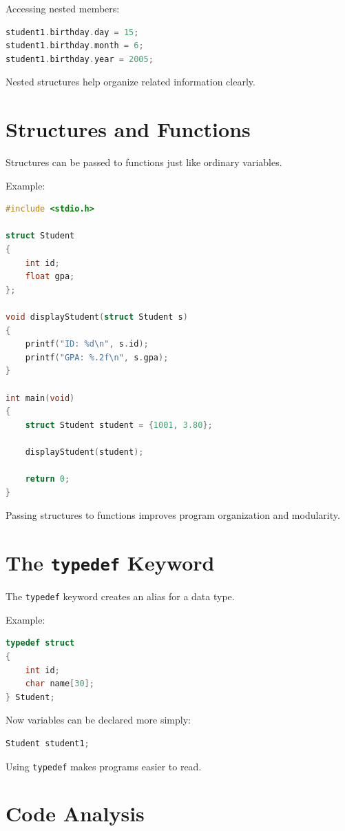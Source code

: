 \documentclass[12pt,openany]{book}
\begin{document}
Accessing nested members:

\begin{lstlisting}[language=C]
student1.birthday.day = 15;
student1.birthday.month = 6;
student1.birthday.year = 2005;
\end{lstlisting}

Nested structures help organize related information clearly.

\section{Structures and Functions}

Structures can be passed to functions just like ordinary variables.

Example:

\begin{lstlisting}[language=C]
#include <stdio.h>

struct Student
{
    int id;
    float gpa;
};

void displayStudent(struct Student s)
{
    printf("ID: %d\n", s.id);
    printf("GPA: %.2f\n", s.gpa);
}

int main(void)
{
    struct Student student = {1001, 3.80};

    displayStudent(student);

    return 0;
}
\end{lstlisting}

Passing structures to functions improves program organization and modularity.

\section{The \texttt{typedef} Keyword}

The \texttt{typedef} keyword creates an alias for a data type.

Example:

\begin{lstlisting}[language=C]
typedef struct
{
    int id;
    char name[30];
} Student;
\end{lstlisting}

Now variables can be declared more simply:

\begin{lstlisting}[language=C]
Student student1;
\end{lstlisting}

Using \texttt{typedef} makes programs easier to read.
\section{Code Analysis}
\end{document}
